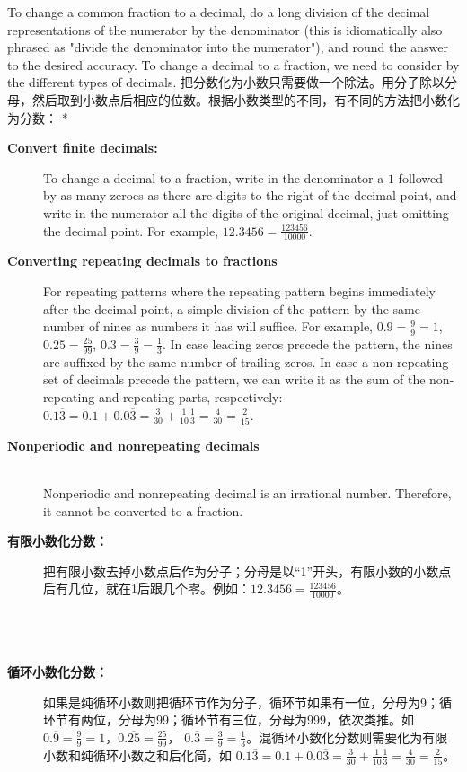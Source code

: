 \begin{paracol}{2}
To change a common fraction to a decimal, do a long division of the decimal representations of the numerator by the denominator (this is idiomatically also phrased as "divide the denominator into the numerator"), and round the answer to the desired accuracy. To change a decimal to a fraction, we need to consider by the different types of decimals.
\switchcolumn[1]
把分数化为小数只需要做一个除法。用分子除以分母，然后取到小数点后相应的位数。根据小数类型的不同，有不同的方法把小数化为分数：
\switchcolumn[0]*
\begin{description}
\item [{\bf Convert finite decimals: }] To change a decimal to a fraction, write in the denominator a  $1$ followed by as many zeroes as there are digits to the right of the decimal point, and write in the numerator all the digits of the original decimal, just omitting the decimal point. For example, $12.3456 = \frac{123456}{10000}$.
\item [{\bf Converting repeating decimals to fractions}] For repeating patterns where the repeating pattern begins immediately after the decimal point, a simple division of the pattern by the same number of nines as numbers it has will suffice. For example, $0.\overline{9}=\frac{9}{9}=1$, $0.\overline{25}=\frac{25}{99}$, $0.\overline{3}=\frac{3}{9}=\frac{1}{3}$. In case leading zeros precede the pattern, the nines are suffixed by the same number of trailing zeros. In case a non-repeating set of decimals precede the pattern, we can write it as the sum of the non-repeating and repeating parts, respectively:
$0.1\overline{3}=0.1+0.0\overline{3}=\frac{3}{30}+\frac{1}{10}\frac{1}{3} = \frac{4}{30} = \frac {2}{15}$.
\item [{\bf Nonperiodic and nonrepeating decimals}] \ \\ Nonperiodic and nonrepeating decimal is an irrational number. Therefore, it cannot be converted to a fraction. 
\end{description} 
\switchcolumn
\begin{description}
\item [{\bf 有限小数化分数：}] 把有限小数去掉小数点后作为分子；分母是以“1”开头，有限小数的小数点后有几位，就在1后跟几个零。例如：$12.3456 = \frac{123456}{10000}$。\\ \\ \\ \\ 
\item [{\bf 循环小数化分数：}] 如果是纯循环小数则把循环节作为分子，循环节如果有一位，分母为9；循环节有两位，分母为99；循环节有三位，分母为999，依次类推。如 $0.\overline{9}=\frac{9}{9}=1$，$0.\overline{25}=\frac{25}{99}$， $0.\overline{3}=\frac{3}{9}=\frac{1}{3}$。混循环小数化分数则需要化为有限小数和纯循环小数之和后化简，如 $0.1\overline{3}=0.1+0.0\overline{3}=\frac{3}{30}+\frac{1}{10}\frac{1}{3} = \frac{4}{30} = \frac {2}{15}$。\\ \\ \\ \\ \\ \\ 

\end{description}
\end{paracol}
